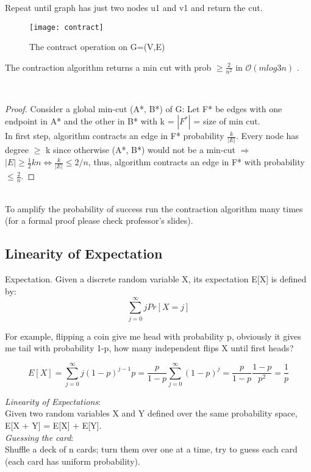 Repeat until graph has just two nodes u1 and v1 and return the cut.

\begin{figure}[H]
    \centering
    \texttt{[image: contract]}
    \caption{The contract operation on G=(V,E)}
\end{figure}

\begin{claim}
    The contraction algorithm returns a min cut with prob $\geq \frac{2}{n^{2}}$ in $\mathcal{O}(m log3 n)$ .
\end{claim}\\

\begin{proof}
    Consider a global min-cut (A*, B*) of G: Let F* be edges with one endpoint in A* and the other in B* with k = $| F^{*} |$ = size of min cut.\\
    In first step, algorithm contracts an edge in F* probability $\frac{k}{| E |}$. Every node has degree $\geq$ k since otherwise (A*, B*) would not be a min-cut $\Rightarrow$ $| E | \geq \frac{1}{2} k n ⇔ \frac{k}{| E |} \leq 2 / n$, thus, algorithm contracts an edge in F* with probability $\leq \frac{2}{n}$.
\end{proof}\\

To amplify the probability of success run the contraction algorithm many times (for a formal proof please check professor's slides).

\subsection{Linearity of Expectation}

Expectation. Given a discrete random variable X, its expectation E[X] is defined by:
\[\sum_{j=0} ^{\infty}j Pr[X=j]\]

For example, flipping a coin give me head with probability p, obviously it gives me tail with probability 1-p, how many independent flips X until first heads?

\[E[X] = \sum_{j=0} ^{\infty}j (1-p)^{j-1}p = \frac{p}{1-p} \sum_{j=0} ^{\infty} (1-p)^{j} = \frac{p}{1-p} \frac{1-p}{p^{2}} = \frac{1}{p} \]

\emph{Linearity of Expectations}:\\
Given two random variables X and Y defined over the same probability space, E[X + Y] = E[X] + E[Y].\\

\emph{Guessing the card}:\\
Shuffle a deck of n cards; turn them over one at a time, try to guess each card (each card has uniform probability).\\

